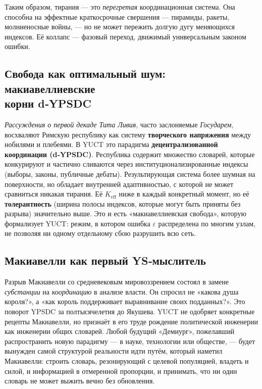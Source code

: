 \documentclass[12pt,a4paper]{article}
\begin{document}
	Таким образом, тирания — это \emph{перегретая} координационная система. Она способна на эффектные краткосрочные свершения — пирамиды, ракеты, молниеносные войны, — но не может пережить долгую дугу меняющихся индексов. Её коллапс — фазовый переход, движимый универсальным законом ошибки.
	
	\subsection{Свобода как оптимальный шум: макиавеллиевские \\ корни d‑YPSDC}
	
	\emph{Рассуждения о первой декаде Тита Ливия}, часто заслоняемые \emph{Государем}, восхваляют Римскую республику как систему \textbf{творческого напряжения} между нобилями и плебеями. В YUCT это парадигма \textbf{децентрализованной координации (d‑YPSDC)}. Республика содержит множество словарей, которые конкурируют и частично сливаются через институционализированные индексы (выборы, законы, публичные дебаты). Результирующая система более шумная на поверхности, но обладает внутренней адаптивностью, с которой не может сравниться никакая тирания. Её \(K_{\mathrm{eff}}\) ниже в каждый конкретный момент, но её \textbf{толерантность} (ширина полосы индексов, которые могут быть приняты без разрыва) значительно выше. Это и есть «макиавеллиевская свобода», которую формализует YUCT: режим, в котором ошибка \(\varepsilon\) распределена по многим узлам, не позволяя ни одному отдельному сбою разрушить всю сеть.
	
	\subsection{Макиавелли как первый YS‑мыслитель}
	
	Разрыв Макиавелли со средневековым мировоззрением состоял в замене \emph{субстанции} на \emph{координацию} в анализе власти. Он спросил не «какова душа короля?», а «как король поддерживает выравнивание своих подданных?». Это поворот YPSDC за полтысячелетия до Якушева. YUCT не одобряет конкретные рецепты Макиавелли, но признаёт в его труде рождение политической инженерии как инженерии общих словарей. Любой будущий «Демиург», пожелавший распространить новую парадигму — в науке, технологии или обществе, — будет вынужден самой структурой реальности идти путём, который наметил Макиавелли: строить словарь, резонирующий с целевой популяцией, владеть и силой, и информацией в отмеренной пропорции, и принимать, что ни один словарь не может выжить вечно без обновления.
	
\end{document}
